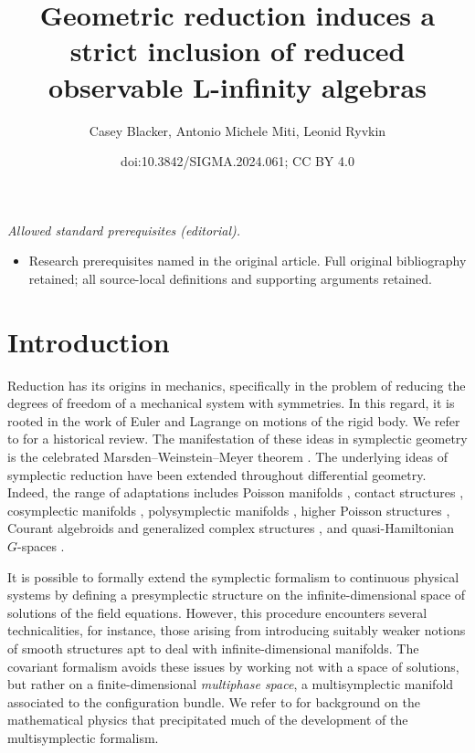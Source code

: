 \documentclass[10pt,a4paper]{amsart}
\title{Geometric reduction induces a strict inclusion of reduced observable L-infinity algebras}
\author{Casey Blacker, Antonio Michele Miti, Leonid Ryvkin}
\date{doi:10.3842/SIGMA.2024.061; CC BY 4.0}
\numberwithin{equation}{section}
\begin{document}
\maketitle
\noindent\textit{Allowed standard prerequisites (editorial).}\begin{itemize}
\item Research prerequisites named in the original article. Full original bibliography retained; all source-local definitions and supporting arguments retained.
\end{itemize}\medskip
\section{Introduction}

Reduction has its origins in mechanics, specifically in the problem of reducing the degrees of freedom of a mechanical system with symmetries. In this regard, it is rooted in the work of Euler and Lagrange on motions of the rigid body. We refer to \cite{CendraMarsdenRatiu01, MarsdenWeinstein01} for a historical review. The manifestation of these ideas in symplectic geometry is the celebrated Marsden--Weinstein--Meyer theorem \cite{MarsdenWeinstein74,Meyer73}. The underlying ideas of symplectic reduction have been extended throughout differential geometry. Indeed, the range of adaptations includes Poisson manifolds \cite{MarsdenRatiu86,Willett02}, contact structures \cite{deLeonLainzValcazar19,Willett02}, cosymplectic manifolds \cite{Albert89}, polysymplectic manifolds \cite{MarreroRoman-RoySalgadoVilarino15}, higher Poisson structures \cite{BursztynMartinezAlbaRubio19}, Courant algebroids and generalized complex structures \cite{BursztynCavalcantiGualtieri07,StienonXu08,Vaisman07}, and quasi-Hamiltonian $G$-spaces \cite{AlekseevMalkinMeinrenken98}.


It is possible to formally extend the symplectic formalism to continuous physical systems by defining a presymplectic structure on the infinite-dimensional space of solutions of the field equations.
However, this procedure encounters several technicalities, for instance, those arising from introducing suitably weaker notions of smooth structures apt to deal with infinite-dimensional manifolds.
The covariant formalism avoids these issues by working not with a space of solutions, but rather on a finite-dimensional \emph{multiphase space}, a multisymplectic manifold associated to the configuration bundle.
We refer to \cite{GotayIsenbergMarsden04, GotayIsenbergMarsdenMontgomery98,Helein12,Kijowski73} for background on the mathematical physics that precipitated much of the development of the multisymplectic formalism.
\end{document}
